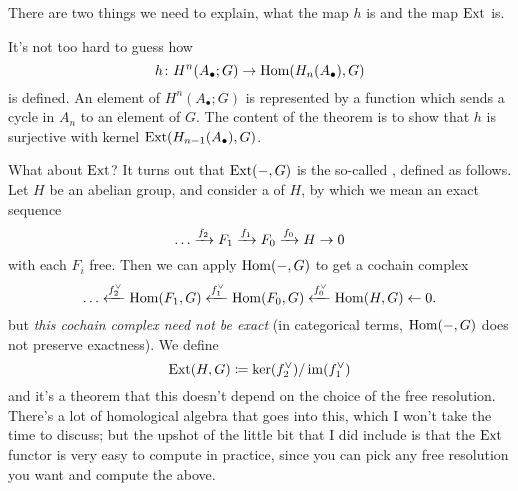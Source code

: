 There are two things we need to explain, what the map $h$ is and the map $\operatorname{Ext}$ is.

It's not too hard to guess how \[ h \colon H^n(A_\bullet; G) \to \operatorname{Hom}(H_n(A_\bullet), G) \] is defined.
An element of $H^n(A_\bullet;G)$ is represented by a function which sends a cycle
in $A_n$ to an element of $G$.
The content of the theorem is to show that $h$ is surjective with kernel $\operatorname{Ext}(H_{n-1}(A_\bullet), G)$.

What about $\operatorname{Ext}$?
It turns out that $\operatorname{Ext}(-,G)$ is the so-called , defined as follows.
Let $H$ be an abelian group, and consider a  of $H$,
by which we mean an exact sequence
\[ \dots \xrightarrow{f_2} F_1 \xrightarrow{f_1} F_0 \xrightarrow{f_0} H \to 0 \]
with each $F_i$ free.
Then we can apply $\operatorname{Hom}(-,G)$ to get a cochain complex
\[ \dots \xleftarrow{f_2^\vee} \operatorname{Hom}(F_1, G) \xleftarrow{f_1^\vee}
	\operatorname{Hom}(F_0, G) \xleftarrow{f_0^\vee} \operatorname{Hom}(H,G) \leftarrow 0. \]
but \emph{this cochain complex need not be exact}
(in categorical terms, $\operatorname{Hom}(-,G)$ does not preserve exactness).
We define \[ \operatorname{Ext}(H,G) \coloneqq \ker(f_2^\vee) / \operatorname{im}(f_1^\vee) \]
and it's a theorem that this doesn't depend on the choice of the free resolution.
There's a lot of homological algebra that goes into this,
which I won't take the time to discuss;
but the upshot of the little bit that I did include is that the $\operatorname{Ext}$
functor is very easy to compute in practice, since
you can pick any free resolution you want and compute the above.


